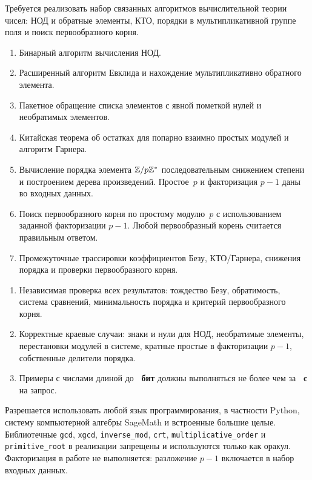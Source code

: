 \documentclass{ca-capstone}
\begin{document}


\goal
Требуется реализовать набор связанных алгоритмов вычислительной теории чисел: НОД и обратные
элементы, КТО, порядки в мультипликативной группе поля и поиск первообразного корня.

\functionality
\begin{enumerate}
  \item Бинарный алгоритм вычисления НОД.
  \item Расширенный алгоритм Евклида и нахождение мультипликативно обратного элемента.
  \item Пакетное обращение списка элементов с явной пометкой нулей и необратимых элементов.
  \item Китайская теорема об остатках для попарно взаимно простых модулей и алгоритм Гарнера.
  \item Вычисление порядка элемента $\mathbb{Z}/p\mathbb{Z}^*$ последовательным снижением степени и построением
    дерева произведений. Простое~$p$ и факторизация $p-1$ даны во входных данных.
  \item Поиск первообразного корня по простому модулю~$p$ с использованием заданной факторизации
    $p-1$. Любой первообразный корень считается правильным ответом.
  \item Промежуточные трассировки коэффициентов Безу, КТО/Гарнера, снижения порядка и проверки
    первообразного корня.
\end{enumerate}

\requirements
\begin{enumerate}
  \item Независимая проверка всех результатов: тождество Безу, обратимость, система сравнений,
    минимальность порядка и критерий первообразного корня.
  \item Корректные краевые случаи: знаки и нули для НОД, необратимые элементы, перестановки
    модулей в системе, кратные простые в факторизации $p-1$, собственные делители порядка.
  \item Примеры с числами длиной до \textbf{\ReqBitsMax~бит} должны выполняться не более чем за
    \textbf{\ReqSeconds~с} на запрос.
\end{enumerate}

\details
Разрешается использовать любой язык программирования, в частности Python, систему 
компьютерной алгебры SageMath и встроенные большие целые. Библиотечные \texttt{gcd},
\texttt{xgcd}, \texttt{inverse\_mod}, \texttt{crt}, \texttt{multiplicative\_order} и
\texttt{primitive\_root} в реализации запрещены и используются только как оракул. Факторизация
в работе не выполняется: разложение $p-1$ включается в набор входных данных.
\end{document}

